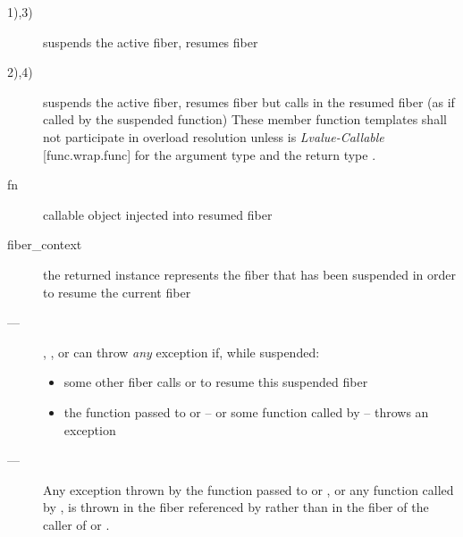 \effects
\begin{description}
    \item[1),3)] suspends the active fiber, resumes fiber 
    \item[2),4)] suspends the active fiber, resumes fiber 
              but calls  in the resumed fiber (as if called by the
              suspended function)
              These member function templates shall not participate in overload
              resolution unless  is \emph{Lvalue-Callable} [func.wrap.func]
              for the argument type  and the return
              type \fiber.
\end{description}

\params
\begin{description}
    \item[fn] callable object injected into resumed fiber
\end{description}

\returns
\begin{description}
    \item[fiber\_context] the returned instance represents the fiber that has been
                 suspended in order to resume the current fiber
\end{description}

\except
\begin{description}
    \item[---] \resume, \resumewith, \xtresume or \xtresumewith can
              throw \emph{any} exception if, while suspended:
              \begin{itemize}
                  \item some other fiber calls \resumewith or \xtresumewith to
                        resume this suspended fiber
                  \item the function  passed to \resumewith
                        or \xtresumewith -- or some function called
                        by  -- throws an exception
              \end{itemize}
    \item[---] Any exception thrown by the function  passed
              to \resumewith or \xtresumewith, or any function called
              by , is thrown in the fiber referenced by 
              rather than in the fiber of the caller of \resumewith
              or \xtresumewith.
\end{description}

